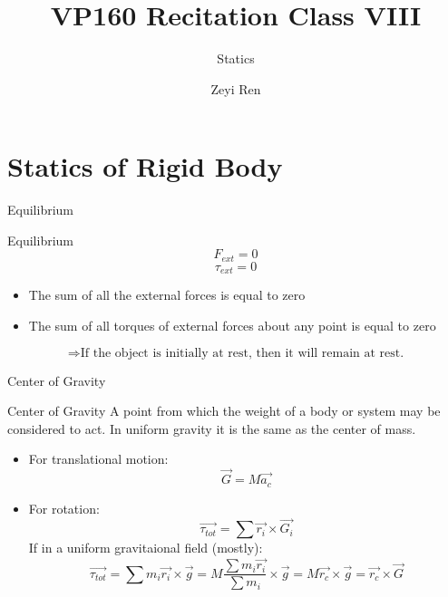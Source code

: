 \documentclass{beamer}
\title{VP160 Recitation Class VIII}
\subtitle{Statics}
\author{Zeyi Ren}
\institute{UM-SJTU Joint Institute}
\begin{document}
\maketitle

\frame{\tableofcontents}

\section{Statics of Rigid Body}
\begin{frame}{Equilibrium}
  \begin{block}{Equilibrium}
    $$F_{ext} = 0$$
    $$\tau_{ext} = 0$$
  \end{block}\pause
  \begin{itemize}
    \item The sum of all the external forces is equal to zero\pause
    \item The sum of all torques of external forces about any point is equal to zero
  \end{itemize}\pause
  $$\Rightarrow \text{If the object is initially at rest, then it will remain at rest.}$$
\end{frame}

\begin{frame}{Center of Gravity}
  \begin{block}{Center of Gravity}
    A point from which the weight of a body or system may be considered to act. In uniform gravity it is the same as the center of mass.
  \end{block}\pause
  \begin{itemize}
    \item For translational motion: $$\vec{G} = M\vec{a_c}$$\pause
    \item For rotation: $$\vec{\tau_{tot}} = \sum \vec{r_i}\times \vec{G_i}$$\pause
    If in a uniform gravitaional field (mostly):
    $$\vec{\tau_{tot}}= \sum m_i\vec{r_i}\times \vec{g} = M\frac{\sum m_i\vec{r_i}}{\sum m_i}\times \vec{g} = M\vec{r_c}\times \vec{g} = \vec{r_c}\times \vec{G}$$
  \end{itemize}
\end{frame}
\end{document}
